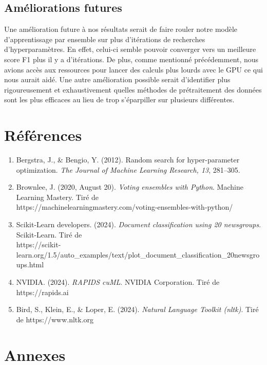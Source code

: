 \documentclass{article}
\begin{document}
\subsection{Améliorations futures}
Une amélioration future à nos résultats serait de faire rouler notre modèle d'apprentissage par ensemble sur plus d'itérations de recherches d'hyperparamètres. En effet, celui-ci semble pouvoir converger vers un meilleure score F1 plus il y a d'itérations. De plus, comme mentionné précédemment, nous avions accès aux ressources pour lancer des calculs plus lourds avec le GPU ce qui nous aurait aidé. Une autre amélioration possible serait d'identifier plus rigoureusement et exhaustivement quelles méthodes de prétraitement des données sont les plus efficaces au lieu de trop s'éparpiller sur plusieurs différentes.

\newpage
\section{Références}
\begin{enumerate}
    \item \label{bergstra2012random} Bergstra, J., \& Bengio, Y. (2012). Random search for hyper-parameter optimization. \textit{The Journal of Machine Learning Research, 13}, 281–305.
    \item Brownlee, J. (2020, August 20). \textit{Voting ensembles with Python}. Machine Learning Mastery. Tiré de \\    https://machinelearningmastery.com/voting-ensembles-with-python/
    \item Scikit-Learn developers. (2024). \textit{Document classification using 20 newsgroups}. Scikit-Learn. Tiré de \\ https://scikit-learn.org/1.5/auto\_examples/text/plot\_document\_classification\_20newsgroups.html
    \item NVIDIA. (2024). \textit{RAPIDS cuML}. NVIDIA Corporation. Tiré de https://rapids.ai

    \item Bird, S., Klein, E., \& Loper, E. (2024). \textit{Natural Language Toolkit (nltk)}. Tiré de https://www.nltk.org

\end{enumerate}

\section{Annexes}
\end{document}
